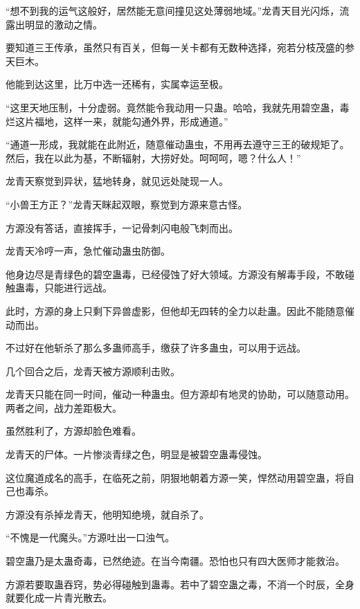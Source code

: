 
\begin{this_body}



“想不到我的运气这般好，居然能无意间撞见这处薄弱地域。”龙青天目光闪烁，流露出明显的激动之情。

要知道三王传承，虽然只有百关，但每一关卡都有无数种选择，宛若分枝茂盛的参天巨木。

他能到达这里，比万中选一还稀有，实属幸运至极。

“这里天地压制，十分虚弱。竟然能令我动用一只蛊。哈哈，我就先用碧空蛊，毒烂这片福地，这样一来，就能勾通外界，形成通道。”

“通道一形成，我就能在此附近，随意催动蛊虫，不用再去遵守三王的破规矩了。然后，我在以此为基，不断辐射，大捞好处。呵呵呵，嗯？什么人！”

龙青天察觉到异状，猛地转身，就见远处陡现一人。

“小兽王方正？”龙青天眯起双眼，察觉到方源来意古怪。

方源没有答话，直接挥手，一记骨刺闪电般飞刺而出。

龙青天冷哼一声，急忙催动蛊虫防御。

他身边尽是青绿色的碧空蛊毒，已经侵蚀了好大领域。方源没有解毒手段，不敢碰触蛊毒，只能进行远战。

此时，方源的身上只剩下异兽虚影，但他却无四转的全力以赴蛊。因此不能随意催动而出。

不过好在他斩杀了那么多蛊师高手，缴获了许多蛊虫，可以用于远战。

几个回合之后，龙青天被方源顺利击败。

龙青天只能在同一时间，催动一种蛊虫。但方源却有地灵的协助，可以随意动用。两者之间，战力差距极大。

虽然胜利了，方源却脸色难看。

龙青天的尸体。一片惨淡青绿之色，明显是被碧空蛊毒侵蚀。

这位魔道成名的高手，在临死之前，阴狠地朝着方源一笑，悍然动用碧空蛊，将自己也毒杀。

方源没有杀掉龙青天，他明知绝境，就自杀了。

“不愧是一代魔头。”方源吐出一口浊气。

碧空蛊乃是太蛊奇毒，已然绝迹。在当今南疆。恐怕也只有四大医师才能救治。

方源若要取蛊吞窍，势必得碰触到蛊毒。若中了碧空蛊之毒，不消一个时辰，全身就要化成一片青光散去。


\end{this_body}
